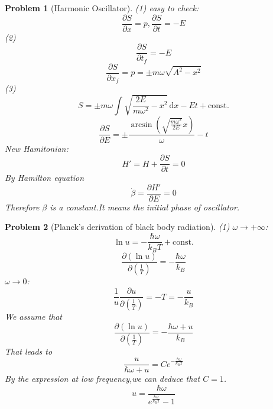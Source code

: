 \documentclass{article}
\theoremstyle{t}
\newtheorem{problem}{Problem}
\newcommand{\dd}{\mathrm{d}}
\newcommand{\pa}{\partial}
\begin{document}
\begin{problem}[Harmonic Oscillator]
    (1) easy to check:
    \begin{equation}
        \frac{\pa S}{\pa x}=p,\frac{\pa S}{\pa t}=-E
    \end{equation}
    (2)\begin{equation}
        \frac{\pa S}{\pa t_f}=-E
    \end{equation}
    \begin{equation}
        \frac{\pa S}{\pa x_f}=p=\pm m \omega \sqrt{A^2-x^2}
    \end{equation}
    (3)
    \begin{equation}
        S=\pm m \omega \int \sqrt{\frac{2E}{m \omega^2}-x^2}\, \dd x-E t+\mathrm{const.}
    \end{equation}
    \begin{equation}
        \frac{\pa S}{\pa E}=\pm \frac{\arcsin (\sqrt{\frac{m \omega^2}{2E}}x)}{\omega}-t
    \end{equation}
    New Hamitonian:
    \begin{equation}
        H'=H+\frac{\pa S}{\pa t}=0
    \end{equation}
    By Hamilton equation
    \begin{equation}
        \dot{\beta}=\frac{\pa H'}{\pa E}=0
    \end{equation}
    Therefore $\beta$ is a constant.It means the initial phase of  oscillator.
\end{problem}
\begin{problem}[Planck’s derivation of black body radiation]
    (1) $\omega \rightarrow +\infty$:
    \begin{equation}
        \ln u=-\frac{\hbar \omega}{k_B T}+\mathrm{const.}
    \end{equation}
    \begin{equation}
        \frac{\pa (\ln u)}{\pa\left(\frac{1}{T}\right)}=-\frac{\hbar \omega}{k_B}
    \end{equation}
    \qquad $\omega\rightarrow 0$:
    \begin{equation}
        \frac{1}{u}\frac{\pa u}{\pa\left(\frac{1}{T}\right)}=-T=-\frac{u}{k_B}
    \end{equation}
    We assume that 
    \begin{equation}
        \frac{\pa(\ln u)}{\pa \left(\frac{1}{T}\right)}=-\frac{\hbar \omega +u}{k_B}
    \end{equation}
    That leads to 
    \begin{equation}
        \frac{u}{\hbar \omega +u}=Ce^{-\frac{\hbar \omega}{k_B T}}
    \end{equation}
    By the expression at low frequency,we can deduce that $C=1$.
    \begin{equation}
        u=\frac{\hbar \omega}{e^{\frac{\hbar \omega}{k_B T}}-1}
    \end{equation}
\end{problem}
\end{document}
